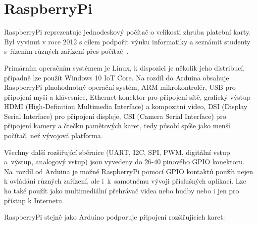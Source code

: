 
\section{RaspberryPi}
\label{KapRaspi}

RaspberryPi reprezentuje jednodeskový počítač o velikosti zhruba platební karty. Byl vyvinut v roce 2012 s cílem podpořit výuku informatiky a seznámit studenty s~řízením různých zařízení přes počítač~\cite{Raspi}. 

Primárním operačním systémem je Linux, k dispozici je několik jeho distribucí, případně lze použít Windows 10 IoT Core. Na rozdíl do Arduina obsahuje RaspberryPi plnohodnotný operační systém, ARM mikrokontrolér, USB pro připojení myši a klávesnice, Ethernet konektor pro připojení sítě, grafický výstup HDMI (High-Definition Multimedia Interface) a kompozitní video, DSI (Display Serial Interface) pro připojení displeje, CSI (Camera Serial Interface) pro připojení kamery a čtečku pamětových karet, tedy působí spíše jako menší počítač, než vývojová platforma. 

Všechny další rozšiřující sběrnice (UART, I2C, SPI, PWM, digitální vstup a~výstup, analogový vstup) jsou vyvedeny do 26-40 pinového GPIO konektoru. Na~rozdíl od Arduina je možné RaspberryPi pomocí GPIO kontaktů použít nejen k ovládání různých zařízení, ale i~k~samotnému vývoji příslušných aplikací. Lze ho také použít jako multimediální přehrávač videa nebo hudby nebo i jen pro přístup k Internetu.

RaspberryPi stejně jako Arduino podporuje připojení rozšiřujících karet:

